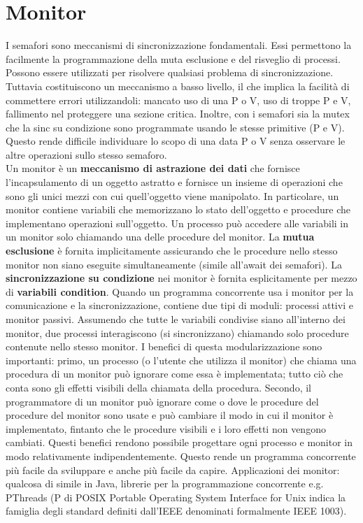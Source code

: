 \documentclass[10pt,a4paper]{book}
\begin{document}
\chapter{Monitor}
I semafori sono meccanismi di sincronizzazione fondamentali. Essi permettono la facilmente la programmazione della muta esclusione e del risveglio di processi. Possono essere utilizzati per risolvere qualsiasi problema di sincronizzazione. Tuttavia costituiscono un meccanismo a basso livello, il che implica la facilità di commettere errori utilizzandoli: mancato uso di una P o V, uso di troppe P e V, fallimento nel proteggere una sezione critica. Inoltre, con i semafori sia la mutex che la sinc su condizione sono programmate usando le stesse primitive (P e V). Questo rende difficile individuare lo scopo di una data P o V senza osservare le altre operazioni sullo stesso semaforo.\\
Un monitor è un \textbf{meccanismo di astrazione dei dati} che fornisce \linebreak  l'incapsulamento di un oggetto astratto e fornisce un insieme di operazioni che sono gli unici mezzi con cui quell'oggetto viene manipolato.
In particolare, un monitor contiene variabili che memorizzano lo stato dell'oggetto e procedure che implementano operazioni sull'oggetto. Un processo può accedere alle variabili in un monitor solo chiamando una delle procedure del monitor. La \textbf{mutua esclusione} è fornita implicitamente assicurando che le procedure
nello stesso monitor non siano eseguite simultaneamente (simile all'await dei semafori).
La \textbf{sincronizzazione su condizione} nei monitor è fornita esplicitamente per mezzo di \textbf{variabili condition}.
Quando un programma concorrente usa i monitor per la comunicazione e la sincronizzazione, contiene due tipi di moduli: processi attivi e monitor passivi.
Assumendo che tutte le variabili condivise siano all'interno dei monitor, due processi interagiscono (si sincronizzano) chiamando solo procedure contenute nello stesso monitor. 
I benefici di questa modularizzazione sono importanti: primo, un processo (o l'utente che utilizza il monitor) che chiama una procedura di un monitor può ignorare come essa è implementata; tutto ciò che conta sono gli effetti visibili della chiamata della procedura. 
Secondo, il programmatore di un monitor può ignorare come o dove le procedure del procedure del monitor sono usate e può cambiare il modo in cui il monitor è implementato, fintanto che le procedure visibili e i loro effetti non vengono cambiati.
Questi benefici rendono possibile progettare ogni processo e monitor in modo relativamente indipendentemente. Questo rende un programma concorrente più facile da sviluppare e anche più facile da capire.
Applicazioni dei monitor: qualcosa di simile in Java, librerie per la programmazione concorrente e.g. PThreads (P di POSIX Portable Operating System Interface for Unix indica la famiglia degli standard definiti dall'IEEE denominati formalmente IEEE 1003).
\end{document}
